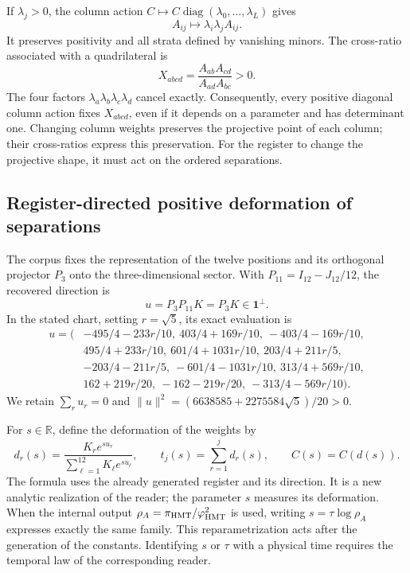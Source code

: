 If \(\lambda_j>0\), the column action
\(C\mapsto C\operatorname{diag}(\lambda_0,\ldots,\lambda_L)\) gives
\[
 A_{ij}\longmapsto\lambda_i\lambda_j A_{ij}.
\]
It preserves positivity and all strata defined by vanishing minors.
The cross-ratio associated with a quadrilateral is
\begin{equation}
 X_{abcd}=\frac{A_{ab}A_{cd}}{A_{ad}A_{bc}}>0.
 \label{eq:nc-crossratio}
\end{equation}
The four factors \(\lambda_a\lambda_b\lambda_c\lambda_d\) cancel
exactly. Consequently, every positive diagonal column action fixes
\(X_{abcd}\), even if it depends on a parameter and has determinant
one. Changing column weights preserves the projective point of each
column; their cross-ratios express this preservation. For the register
to change the projective shape, it must act on the ordered separations.

\subsection{Register-directed positive deformation of separations}

The corpus fixes the representation of the twelve positions and its
orthogonal projector \(P_3\) onto the three-dimensional sector.
With \(P_{11}=I_{12}-J_{12}/12\), the recovered direction is
\[
 u=P_3P_{11}K=P_3K\in\mathbf1^\perp.
\]
In the stated chart, setting \(r=\sqrt5\), its exact evaluation is
\begin{align*}
u=(&-495/4-233r/10,\ 403/4+169r/10,\ -403/4-169r/10,\\
   &495/4+233r/10,\ 601/4+1031r/10,\ 203/4+211r/5,\\
   &-203/4-211r/5,\ -601/4-1031r/10,\ 313/4+569r/10,\\
   &162+219r/20,\ -162-219r/20,\ -313/4-569r/10).
\end{align*}
We retain \(\sum_ru_r=0\) and
\(\|u\|^2=(6638585+2275584\sqrt5)/20>0\).

For \(s\in\mathbb R\), define the deformation of the weights by
\begin{equation}
 d_r(s)=\frac{K_re^{su_r}}{\sum_{\ell=1}^{12}K_\ell e^{su_\ell}},
 \qquad t_j(s)=\sum_{r=1}^jd_r(s),\qquad C(s)=C(d(s)).
 \label{eq:nc-gap-flow}
\end{equation}
The formula uses the already generated register and its direction.
It is a new analytic realization of the reader; the parameter \(s\)
measures its deformation. When the internal output
\(\rho_A=\pi_{\rm HMT}/\varphi_{\rm HMT}^2\) is used, writing
\(s=\tau\log\rho_A\) expresses exactly the same family.
This reparametrization acts after the generation of the constants.
Identifying \(s\) or \(\tau\) with a physical time requires the
temporal law of the corresponding reader.

